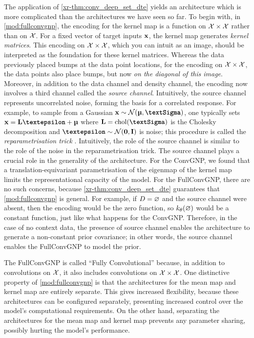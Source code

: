 \documentclass[12pt]{report}
\newcommand{\xrprefix}[1]{xr-#1}
\begin{document}
The application of \cref{\xrprefix{thm:conv_deep_set_dte}} yields an architecture which is more complicated than the architectures we have seen so far.
To begin with, in \cref{mod:fullconvgnp}, the encoding for the kernel map is a function on $\mathcal{X} \times \mathcal{X}$ rather than on $\mathcal{X}$.
For a fixed vector of target inputs $\mathbf{x}$, the kernel map generates \emph{kernel matrices}. %
This encoding on $\mathcal{X} \times \mathcal{X}$, which you can intuit as an image, should be interpreted as the foundation for these kernel matrices.
Whereas the data previously placed bumps at the data point locations, for the encoding on $\mathcal{X} \times \mathcal{X}$, the data points also place bumps, but now \emph{on the diagonal of this image}.
%
Moreover, in addition to the data channel and density channel, the encoding now involves a third channel called the \emph{source channel}.
Intuitively, the source channel represents uncorrelated noise, forming the basis for a correlated response.
For example, to sample from a Gaussian $\vx \sim \Normal(\vmu, \mSigma)$, one typically sets $\vx = \mL \vep + \vmu$ where
$\mL = \chol(\mSigma)$ is the Cholesky decomposition 
and $\vep \sim \Normal(\vnull, \mI)$ is noise;
this procedure is called the \emph{reparametrisation trick} \parencite{Kingma:2013:Auto-Encoding_VB}.
Intuitively, the role of the source channel is similar to the role of the noise in the reparametrisation trick.
The source channel plays a crucial role in the generality of the architecture.
%
For the ConvGNP, we found that a translation-equivariant parametrisation of the eigenmap of the kernel map limits the representational capacity of the model.
For the FullConvGNP, there are no such concerns, because \cref{\xrprefix{thm:conv_deep_set_dte}} guarantees that \cref{mod:fullconvgnp} is general.
For example, if $D = \varnothing$ and the source channel were absent, then the encoding would be the zero function, so $k_\theta(\varnothing)$ would be a constant function, just like what happens for the ConvGNP.
Therefore, in the case of no context data, the presence of source channel enables the architecture to generate a non-constant prior covariance;
in other words, the source channel enables the FullConvGNP to model the prior.

The FullConvGNP is called ``Fully Convolutional'' because, in addition to convolutions on $\mathcal{X}$, it also includes convolutions on $\mathcal{X} \times \mathcal{X}$.
One distinctive property of \cref{mod:fullconvgnp} is that the architectures for the mean map and kernel map are entirely separate.
This gives increased flexibility, because these architectures can be configured separately, presenting increased control over the model's computational requirements.
On the other hand, separating the architectures for the mean map and kernel map
prevents any parameter sharing, possibly hurting the model's performance.
\end{document}
